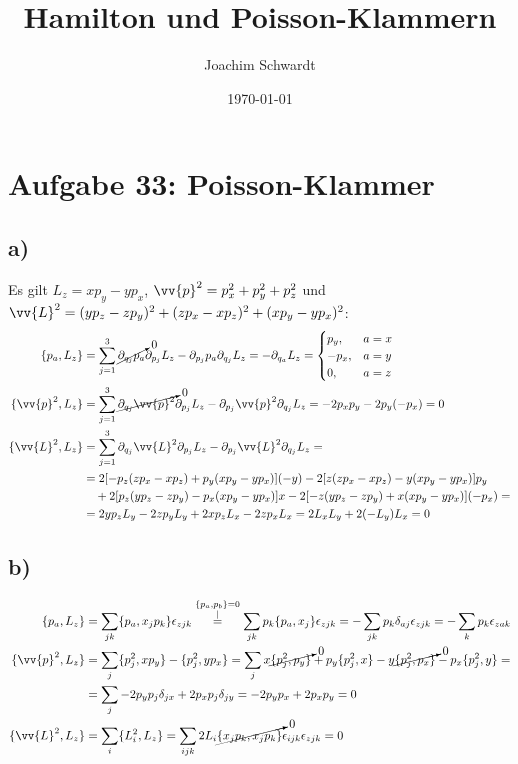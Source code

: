 \documentclass[a4paper,12pt]{article}
\begin{document}
\title{Hamilton und Poisson-Klammern}
\author{Joachim Schwardt}
\date{\today}
\maketitle

\section*{Aufgabe 33: Poisson-Klammer}
\subsection*{a)} Es gilt $L_z=xp_y-yp_x$, $\vv{p}^2=p_x^2+p_y^2+p_z^2$ und $\vv{L}^2=(yp_z-zp_y)^2+(zp_x-xp_z)^2+(xp_y-yp_x)^2$:
\begin{align*}
\{p_a, L_z\}&=\sum_{j=1}^{3}\cancelto{0}{\partial_{q_j}p_a}\partial_{p_j}L_z-\partial_{p_j}p_a\partial_{q_j}L_z=-\partial_{q_a}L_z=\begin{cases} p_y,& a=x \\ -p_x,& a=y \\ 0,& a=z
\end{cases}\\
\{\vv{p}^2, L_z\}&=\sum_{j=1}^{3}\cancelto{0}{\partial_{q_j}\vv{p}^2}\partial_{p_j}L_z-\partial_{p_j}\vv{p}^2\partial_{q_j}L_z=-2p_xp_y-2p_y(-p_x)=0\\
\{\vv{L}^2, L_z\}&=\sum_{j=1}^{3}\partial_{q_j}\vv{L}^2\partial_{p_j}L_z-\partial_{p_j}\vv{L}^2\partial_{q_j}L_z=\\
&=2[-p_z(zp_x-xp_z)+p_y(xp_y-yp_x)](-y)-2[z(zp_x-xp_z)-y(xp_y-yp_x)]p_y\\
&\ \ \ +2[p_z(yp_z-zp_y)-p_x(xp_y-yp_x)]x-2[-z(yp_z-zp_y)+x(xp_y-yp_x)](-p_x)=\\
&=2yp_zL_y-2zp_yL_y+2xp_zL_x-2zp_xL_x=2L_xL_y+2(-L_y)L_x=0
\end{align*}
\subsection*{b)}
\begin{align*}
\{p_a, L_z\}&=\sum_{jk}\{p_a,x_jp_k\}\epsilon_{zjk}\overset{\substack{\{p_a,p_b\}=0\\|}}{=}\sum_{jk}p_k\{p_a,x_j\}\epsilon_{zjk}=-\sum_{jk}p_k\delta_{aj}\epsilon_{zjk}=-\sum_{k}p_k\epsilon_{zak}\\
\{\vv{p}^2, L_z\}&=\sum_j\{p_j^2, xp_y\}-\{p_j^2,yp_x\}=\sum_j x\cancelto{0}{\{p_j^2,p_y\}}+p_y\{p_j^2,x\}-y\cancelto{0}{\{p_j^2, p_x\}}-p_x\{p_j^2, y\}=\\
&=\sum_j -2p_yp_j\delta_{jx}+2p_xp_j\delta_{jy}=-2p_yp_x+2p_xp_y=0\\
\{\vv{L}^2, L_z\}&=\sum_i \{L_i^2, L_z\}=\sum_{ijk} 2L_i\cancelto{0}{\{x_jp_k,x_jp_k\}}\epsilon_{ijk}\epsilon_{zjk}=0
\end{align*}
\end{document}
